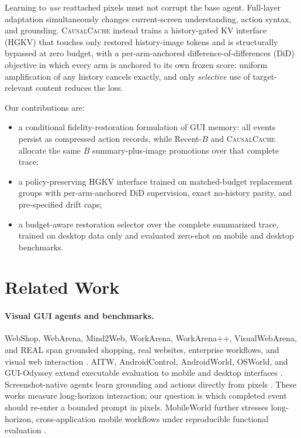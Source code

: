 \documentclass[letterpaper]{article} %
\newcommand{\method}{\textsc{CausalCache}}
\newcommand{\hgkv}{\textsc{HGKV}}
\begin{document}
Learning to \emph{use} reattached pixels must not corrupt the base agent.
Full-layer adaptation simultaneously changes current-screen understanding,
action syntax, and grounding. \method{} instead trains a history-gated KV interface
(\hgkv) that touches only restored history-image tokens and is structurally
bypassed at zero budget, with a per-arm-anchored difference-of-differences
(DiD) objective in
which every arm is anchored to its own frozen score: uniform amplification of
any history cancels exactly, and only \emph{selective} use of target-relevant
content reduces the loss.

Our contributions are:
\begin{itemize}
    \item a conditional fidelity-restoration formulation of GUI memory:
    all events persist as compressed action records, while Recent-$B$ and
    \method{} allocate the same $B$ summary-plus-image promotions over that
    complete trace;
    \item a policy-preserving \hgkv{} interface trained on matched-budget
    replacement groups with per-arm-anchored DiD supervision, exact
    no-history parity, and pre-specified drift caps;
    \item a budget-aware restoration selector over the complete summarized
    trace, trained on desktop data only and evaluated zero-shot on mobile and
    desktop benchmarks.
\end{itemize}

\section{Related Work}

\paragraph{Visual GUI agents and benchmarks.}
WebShop, WebArena, Mind2Web, WorkArena, WorkArena++, VisualWebArena, and REAL
span grounded shopping, real websites, enterprise workflows, and visual web
interaction \citep{yao2022webshop,zhou2024webarena,deng2023mind2web,
drouin2024workarena,boisvert2024workarenaplus,koh2024visualwebarena,
garg2025real}. AITW, AndroidControl, AndroidWorld, OSWorld, and GUI-Odyssey
extend executable evaluation to mobile and desktop interfaces
\citep{rawles2023aitw,li2024androidcontrol,rawles2025androidworld,
xie2024osworld,lu2025guiodyssey}. Screenshot-native agents learn grounding and
actions directly from pixels \citep{hong2024cogagent,cheng2024seeclick,
lin2025showui,xu2026mobileagent35}. These works measure long-horizon
interaction; our question is which completed event should re-enter a bounded
prompt in pixels.
MobileWorld further stresses long-horizon, cross-application mobile workflows
under reproducible functional evaluation \citep{kong2026mobileworld}.
\end{document}
